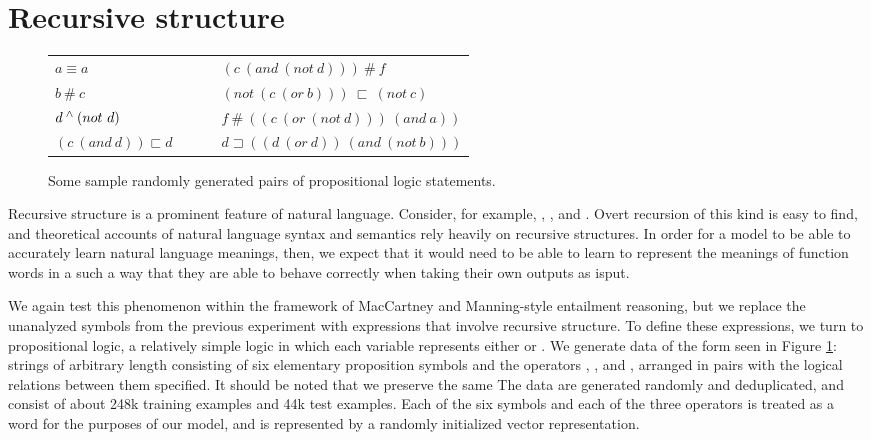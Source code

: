 \section{Recursive structure}

\begin{figure}[t]
\begin{center}
\begin{tabular}{lll}
$a\equiv a$		&~~~&	$(c~(and~(not~d)))~\#~f$\\
$b~\#~c$			&~~~&	$(not~(c~(or~b)))~\sqsubset~(not~c)$\\
$d\mathbin{^{\wedge}}(not~d)$	&~~~&	$f~\#~((c~(or~(not~d)))~(and~a))$\\
$(c~(and~d))\sqsubset d$&~~~&$d\sqsupset((d~(or~d))~(and~(not~b)))$\\
\end{tabular}
\end{center}

\caption{Some sample randomly generated pairs of propositional logic statements.  \label{prop-figure}} 
\end{figure}


Recursive structure is a prominent feature of natural language. Consider, for example, , , and . Overt recursion of this kind is easy to find, and theoretical accounts of natural language syntax and semantics rely heavily on recursive structures.
In order for a model to be able to accurately learn natural language meanings, then, we expect that it would need to be able to learn to represent the meanings of function words in a such a way that they are able to behave correctly when taking their own outputs as isput.

We again test this phenomenon within the framework of MacCartney and Manning-style entailment reasoning, but we replace the unanalyzed symbols from the previous experiment with expressions that involve recursive structure. To define these expressions, we turn to propositional logic, a relatively simple logic in which each variable represents either  or . We generate data of the form seen in Figure \ref{prop-figure}: strings of arbitrary length consisting of six elementary proposition symbols and the operators , , and , arranged in pairs with the logical relations between them specified. It should be noted that we preserve the same  The data are generated randomly and deduplicated, and consist of about 248k training examples and 44k test examples. Each of the six symbols and each of the three operators is treated as a word for the purposes of our model, and is represented by a randomly initialized vector representation.

